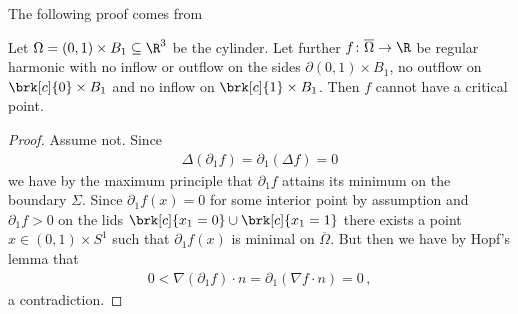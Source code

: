 The following proof comes from \cite{Wahlen2023}
\begin{proposition}
  Let $\Omega=(0,1)\times B_1\subseteq\R^3$ be the cylinder. Let further $f\colon\overline{\Omega}\to\R$ be regular 
  harmonic with no inflow or outflow on the sides 
  $\partial (0,1)\times B_1$, no outflow on $\brk[c]{0}\times B_1$ and no inflow on $\brk[c]{1}\times B_1$. 
  Then $f$ cannot have a critical point.
\end{proposition}
\begin{proof}
  Assume not. Since
  \begin{align*}
    \Delta(\partial_1f)=\partial_1(\Delta f)=0
  \end{align*}
  we have by the maximum principle that $\partial_1 f$ attains its minimum on the boundary $\Sigma$. Since $\partial_1 f(x)=0$ for some interior point 
  by assumption and $\partial_1 f>0$ on the lids $\brk[c]{x_1=0}\cup\brk[c]{x_1=1}$ there exists a point
  $x\in(0,1)\times S^1$ such that $\partial_1f(x)$ is minimal on $\overline{\Omega}$. But then we have by Hopf's lemma
  that
  \begin{align*}
    0<\nabla (\partial_1f)\cdot n=\partial_1(\nabla f\cdot n)=0\,,
  \end{align*}
  a contradiction.
\end{proof}

\newpage

